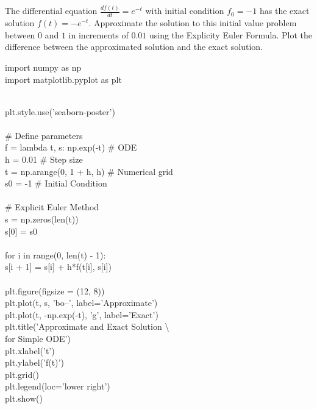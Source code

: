 \begin{myexercise}\label{Comprehensionquiz2}
The differential equation $\frac{df(t)}{dt}=e^{-t}$ with initial condition $f_0=-1$ has the exact solution $f(t)=-e^{-t}$. Approximate the solution to this initial value problem between $0$ and $1$ in increments of $0.01$ using the Explicity Euler Formula. Plot the difference between the approximated solution and the exact solution.
\end{myexercise}
\begin{mysolution}
\end{mysolution}
\begin{boxB}
import numpy as np\\
import matplotlib.pyplot as plt
\end{boxB}

\begin{boxB}
~\\
plt.style.use('seaborn-poster')\\
\\
\# Define parameters\\
f = lambda t, s: np.exp(-t) \# ODE\\
h = 0.01 \# Step size\\
t = np.arange(0, 1 + h, h) \# Numerical grid\\
s0 = -1 \# Initial Condition\\
\\
\# Explicit Euler Method\\
s = np.zeros(len(t))\\
s[0] = s0\\
\\
for i in range(0, len(t) - 1):\\
    \hspace*{1cm}s[i + 1] = s[i] + h*f(t[i], s[i])\\
\\
plt.figure(figsize = (12, 8))\\
plt.plot(t, s, 'bo--', label='Approximate')\\
plt.plot(t, -np.exp(-t), 'g', label='Exact')\\
plt.title('Approximate and Exact Solution \textbackslash \\
for Simple ODE')\\
plt.xlabel('t')\\
plt.ylabel('f(t)')\\
plt.grid()\\
plt.legend(loc='lower right')\\
plt.show()
\end{boxB}

